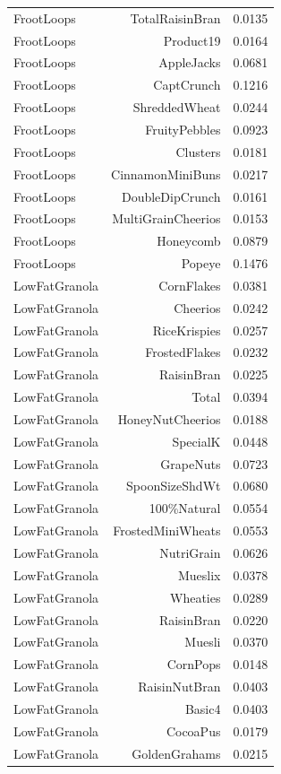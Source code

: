 \begin{longtable}{@{}lrr@{}}
FrootLoops & TotalRaisinBran & 0.0135 \\
FrootLoops & Product19 & 0.0164 \\
FrootLoops & AppleJacks & 0.0681 \\
FrootLoops & CaptCrunch & 0.1216 \\
FrootLoops & ShreddedWheat & 0.0244 \\
FrootLoops & FruityPebbles & 0.0923 \\
FrootLoops & Clusters & 0.0181 \\
FrootLoops & CinnamonMiniBuns & 0.0217 \\
FrootLoops & DoubleDipCrunch & 0.0161 \\
FrootLoops & MultiGrainCheerios & 0.0153 \\
FrootLoops & Honeycomb & 0.0879 \\
FrootLoops & Popeye & 0.1476 \\
LowFatGranola & CornFlakes & 0.0381 \\
LowFatGranola & Cheerios & 0.0242 \\
LowFatGranola & RiceKrispies & 0.0257 \\
LowFatGranola & FrostedFlakes & 0.0232 \\
LowFatGranola & RaisinBran & 0.0225 \\
LowFatGranola & Total & 0.0394 \\
LowFatGranola & HoneyNutCheerios & 0.0188 \\
LowFatGranola & SpecialK & 0.0448 \\
LowFatGranola & GrapeNuts & 0.0723 \\
LowFatGranola & SpoonSizeShdWt & 0.0680 \\
LowFatGranola & 100\%Natural & 0.0554 \\
LowFatGranola & FrostedMiniWheats & 0.0553 \\
LowFatGranola & NutriGrain & 0.0626 \\
LowFatGranola & Mueslix & 0.0378 \\
LowFatGranola & Wheaties & 0.0289 \\
LowFatGranola & RaisinBran & 0.0220 \\
LowFatGranola & Muesli & 0.0370 \\
LowFatGranola & CornPops & 0.0148 \\
LowFatGranola & RaisinNutBran & 0.0403 \\
LowFatGranola & Basic4 & 0.0403 \\
LowFatGranola & CocoaPus & 0.0179 \\
LowFatGranola & GoldenGrahams & 0.0215 \\

\end{longtable}
